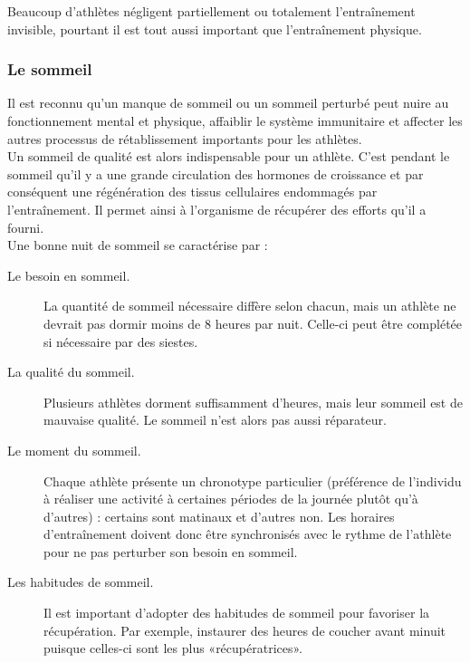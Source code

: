             Beaucoup d'athlètes négligent partiellement ou totalement l'entraînement invisible, pourtant il est tout aussi important que l'entraînement physique. \\
            
    
                \subsubsection{Le sommeil}
        
                    Il est reconnu qu’un manque de sommeil ou un sommeil perturbé peut nuire au fonctionnement mental et physique, affaiblir le système immunitaire et affecter les autres processus de rétablissement importants pour les athlètes.\\
                    
                    Un sommeil de qualité est alors indispensable pour un athlète. C’est pendant le sommeil qu’il y a une grande circulation des hormones de croissance et par conséquent une régénération des tissus cellulaires endommagés par l’entraînement. Il permet ainsi à l’organisme de récupérer des efforts qu’il a fourni. \\
                    
                    Une bonne nuit de sommeil se caractérise par :
                    \begin{description}
                        \item [Le besoin en sommeil.] La quantité de sommeil nécessaire diffère selon chacun, mais un athlète ne devrait pas dormir moins de 8 heures par nuit. Celle-ci peut être complétée si nécessaire par des siestes.
                     
                        \item [La qualité du sommeil.] Plusieurs athlètes dorment suffisamment d’heures,
                        mais leur sommeil est de mauvaise qualité. Le sommeil n'est alors pas aussi réparateur.
                        \item [Le moment du sommeil.] Chaque athlète présente un chronotype particulier (préférence de l’individu à réaliser une activité à certaines périodes de la journée plutôt qu’à d’autres) : certains sont matinaux et d'autres non. Les horaires d'entraînement doivent donc être synchronisés avec le rythme de l'athlète pour ne pas perturber son besoin en sommeil.
                        \item [Les habitudes de sommeil.] Il est important d'adopter des habitudes de sommeil pour favoriser la récupération. Par exemple, instaurer des heures de coucher avant minuit puisque celles-ci sont les plus «récupératrices».\\
                    \end{description}
                
